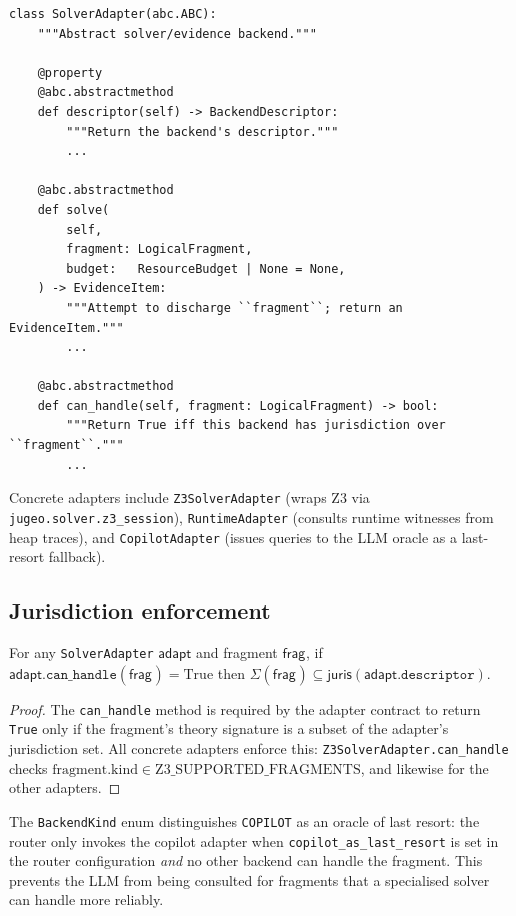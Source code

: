 \documentclass[11pt]{article}
\newcommand{\Frag}[1]{\mathsf{frag}_{#1}} %
\newcommand{\BJuris}{\mathsf{juris}}      %
\newcommand{\BAdapt}{\mathsf{adapt}}      %
\begin{document}
\begin{lstlisting}[style=jugeo-python,
  caption={SolverAdapter abstract interface.},
  label={lst:adapter}]
class SolverAdapter(abc.ABC):
    """Abstract solver/evidence backend."""

    @property
    @abc.abstractmethod
    def descriptor(self) -> BackendDescriptor:
        """Return the backend's descriptor."""
        ...

    @abc.abstractmethod
    def solve(
        self,
        fragment: LogicalFragment,
        budget:   ResourceBudget | None = None,
    ) -> EvidenceItem:
        """Attempt to discharge ``fragment``; return an EvidenceItem."""
        ...

    @abc.abstractmethod
    def can_handle(self, fragment: LogicalFragment) -> bool:
        """Return True iff this backend has jurisdiction over ``fragment``."""
        ...
\end{lstlisting}

Concrete adapters include \texttt{Z3SolverAdapter} (wraps Z3 via
\texttt{jugeo.solver.z3\_session}), \texttt{RuntimeAdapter} (consults
runtime witnesses from heap traces), and \texttt{CopilotAdapter}
(issues queries to the LLM oracle as a last-resort fallback).

\subsection{Jurisdiction enforcement}\label{sec:juris-enforce}

\begin{proposition}\label{prop:adapter-juris}
For any \texttt{SolverAdapter} $\BAdapt$ and fragment $\Frag{}$,
if $\BAdapt.\texttt{can\_handle}(\Frag{}) = \mathrm{True}$ then
$\Sigma(\Frag{}) \subseteq \BJuris(\BAdapt.\texttt{descriptor})$.
\end{proposition}

\begin{proof}
The \texttt{can\_handle} method is required by the adapter contract to
return \texttt{True} only if the fragment's theory signature is a
subset of the adapter's jurisdiction set.  All concrete adapters
enforce this: \texttt{Z3SolverAdapter.can\_handle} checks
$\mathrm{fragment.kind} \in \mathrm{Z3\_SUPPORTED\_FRAGMENTS}$, and
likewise for the other adapters.
\end{proof}

\begin{remark}
The \texttt{BackendKind} enum distinguishes \texttt{COPILOT} as an
oracle of last resort: the router only invokes the copilot adapter when
\texttt{copilot\_as\_last\_resort} is set in the router configuration
\emph{and} no other backend can handle the fragment.  This prevents the
LLM from being consulted for fragments that a specialised solver can
handle more reliably.
\end{remark}
\end{document}
